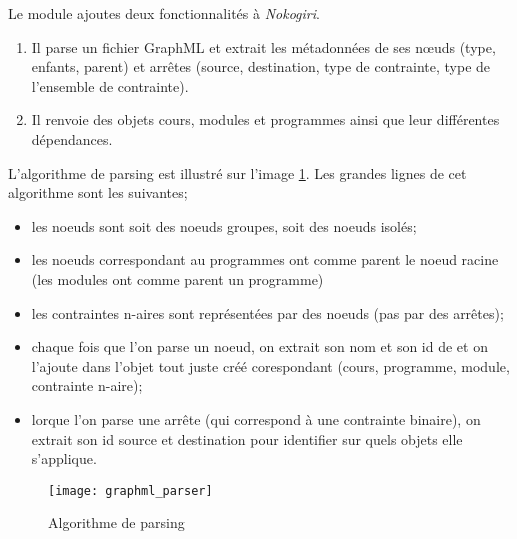 Le module ajoutes deux fonctionnalités à \textit{Nokogiri}.
\begin{enumerate}
  \item Il parse un fichier GraphML et extrait les métadonnées de ses nœuds (type, enfants, parent) et arrêtes (source, destination, type de contrainte, type de l'ensemble de contrainte). 
  \item Il renvoie des objets cours, modules et programmes ainsi que leur différentes dépendances.  
\end{enumerate}

L'algorithme de parsing est illustré sur l'image \ref{fig:graphml_parser}. Les grandes lignes de cet algorithme sont les suivantes;

\begin{itemize}
\item les noeuds sont soit des noeuds groupes, soit des noeuds isolés;
\item les noeuds correspondant au programmes ont comme parent le noeud racine (les modules ont comme parent un programme)
\item les contraintes n-aires sont représentées par des noeuds (pas par des arrêtes);
\item chaque fois que l'on parse un noeud, on extrait son nom et son id de et on l'ajoute dans l'objet  tout juste créé corespondant (cours, programme, module, contrainte n-aire);
\item lorque l'on parse une arrête (qui correspond à une contrainte binaire), on extrait son id source et destination pour identifier sur quels objets elle s'applique. 
\end{itemize}

\begin{figure}
\centering
\caption{Algorithme de parsing}
\label{fig:graphml_parser}
\texttt{[image: graphml\_parser]}
\end{figure}




